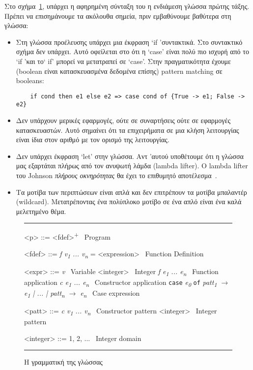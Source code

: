 \documentclass[diploma]{softlab-thesis}
\begin{document}
Στο σχήμα~\ref{fig:elgrammar}, υπάρχει η αφηρημένη σύνταξη του
η ενδιάμεση γλώσσα πρώτης τάξης.
Πρέπει να επισημάνουμε τα ακόλουθα σημεία, πριν εμβαθύνουμε βαθύτερα στη γλώσσα:
\begin{itemize}
  \item Στη γλώσσα προέλευσης υπάρχει μια έκφραση `if 'συντακτικά. Στο συντακτικό σχήμα δεν υπάρχει.
Αυτό οφείλεται στο ότι η `case' είναι πολύ πιο ισχυρή από το `if 'και το` if' μπορεί να μετατραπεί 
σε `case'. Στην πραγματικότητα έχουμε (boolean είναι κατασκευασμένα δεδομένα επίσης) pattern matching 
σε booleans:
\begin{verbatim}
    if cond then e1 else e2 => case cond of {True -> e1; False -> e2}
\end{verbatim}
\item Δεν υπάρχουν μερικές εφαρμογές, ούτε σε συναρτήσεις ούτε σε εφαρμογές κατασκευαστών.
Αυτό σημαίνει ότι τα επιχειρήματα σε μια κλήση λειτουργίας είναι ίδια στον αριθμό με τον ορισμό 
της λειτουργίας.
\item Δεν υπάρχει έκφραση `let' στην γλώσσα. Αντ 'αυτού υποθέτουμε ότι η γλώσσα μας εξαρτάται 
πλήρως από τον ανυψωτή λάμδα (lambda lifter). O lambda lifter του Johnson 
\textit{πλήρους οκνηρότητας} θα έχει το επιθυμητό αποτέλεσμα~\cite{Johnsson:1985:LLT:5280.5292}.
\item Τα μοτίβα των περιπτώσεων είναι απλά και δεν επιτρέπουν τα μοτίβα μπαλαντέρ (wildcard). 
Μετατρέποντας ένα πολύπλοκο μοτίβο σε ένα απλό είναι ένα καλά μελετημένο θέμα.
\end{itemize}


\begin{figure}[t]
  \hrule
  \begin{grammar}
      <p> ::= <fdef>\textsuperscript{+} \hfill\ Program
  
      <fdef> ::= \textit{f v\textsubscript{1} ... v\textsubscript{n}} = <expression> \hfill\ Function Definition
  
      <expr> ::= \textit{v} \hfill\ Variable
      \alt <integer> \hfill\ Integer
      \alt \textit{f e\textsubscript{1} ... e\textsubscript{n}} \hfill\ Function application
      \alt \textit{c e\textsubscript{1} ... e\textsubscript{n}} \hfill\ Constructor application
      \alt \texttt{case} \textit{e\textsubscript{0}} \texttt{of} \textit{patt\textsubscript{1} $\rightarrow$ e\textsubscript{1} | ... | patt\textsubscript{n} $\rightarrow$ e\textsubscript{n}} \hfill\ Case expression
       
      <patt> ::= \textit{c v\textsubscript{1} ... v\textsubscript{n}} \hfill\ Constructor pattern
      \alt <integer> \hfill\ Integer pattern
  
      <integer> ::= 1, 2, ... \hfill\ Integer domain
  
  \end{grammar}
  \hrule
\caption{Η γραμματική της γλώσσας\label{fig:elgrammar}}
\end{figure}
\end{document}
